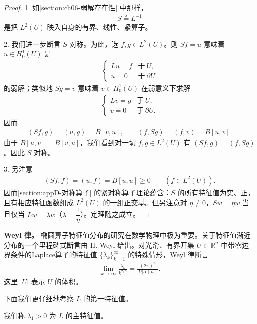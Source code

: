 \documentclass[../../main.tex]{subfiles}
\begin{document}
\begin{proof}
1. 如\cref{section:ch06-弱解存在性} 中那样，
\begin{align*}
S\triangleq L^{-1}
\end{align*}
是把 $L^{2}(U)$ 映入自身的有界、线性、紧算子。

2. 我们进一步断言 $S$ 对称。为此，选 $f,g\in L^{2}(U)$。则 $Sf=u$ 意味着 $u\in H^{1}_{0}(U)$ 是
\begin{align*}
\begin{cases}
Lu=f & \text{于}\ U,\\
u=0 & \text{于}\ \partial U
\end{cases}
\end{align*}
的弱解；类似地 $Sg=v$ 意味着 $v\in H^{1}_{0}(U)$ 在弱意义下求解
\begin{align*}
\begin{cases}
Lv=g & \text{于}\ U,\\
v=0 & \text{于}\ \partial U.
\end{cases}
\end{align*}
因而
\begin{align*}
(Sf,g)=(u,g)=B[v,u],\qquad (f,Sg)=(f,v)=B[u,v].
\end{align*}
由于 $B[u,v]=B[v,u]$，我们看到对一切 $f,g\in L^{2}(U)$ 有 $(Sf,g)=(f,Sg)$。因此 $S$ 对称。

3. 另注意
\begin{align*}
(Sf,f)=(u,f)=B[u,u]\geqslant 0\qquad (f\in L^{2}(U)).
\end{align*}
因而\cref{section:appD-对称算子} 的紧对称算子理论蕴含：$S$ 的所有特征值为实、正，且有相应特征函数组成 $L^{2}(U)$ 的一组正交基。但另注意对 $\eta\neq 0$，$Sw=\eta w$ 当且仅当 $Lw=\lambda w$（$\lambda=\dfrac{1}{\eta}$）。定理随之成立。
\end{proof}

\textbf{Weyl 律。} 椭圆算子特征值分布的研究在数学物理中极为重要。关于特征值渐近分布的一个里程碑式断言由 H. Weyl 给出。对光滑、有界开集 $U\subset\mathbb{R}^{n}$ 中带零边界条件的Laplace算子的特征值 $\{\lambda_{k}\}_{k=1}^{\infty}$ 的特殊情形，Weyl 律断言
\begin{align}
\lim_{k\to\infty}\frac{\lambda_{k}}{k^{2/n}}=\frac{(2\pi)^{n}}{|U|\alpha(n)}.
\end{align}
这里 $|U|$ 表示 $U$ 的体积。

下面我们更仔细地考察 $L$ 的第一特征值。

\begin{definition}\label{definition:ch06-主特征值}
我们称 $\lambda_{1}>0$ 为 $L$ 的主特征值。
\end{definition}
\end{document}
